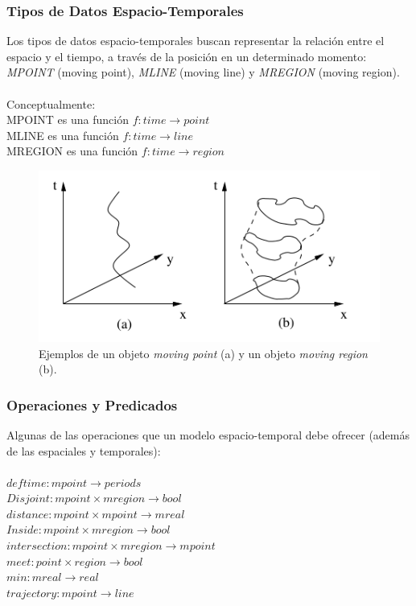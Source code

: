 \documentclass[a4paper,12pt,oneside]{report}
\begin{document}
\subsubsection*{Tipos de Datos Espacio-Temporales}
Los tipos de datos espacio-temporales buscan representar la relaci\'on entre el espacio y el tiempo, a trav\'es de la posici\'on en un determinado momento: \textit{MPOINT} (moving point), \textit{MLINE} (moving line) y \textit{MREGION} (moving region).\\
\ \\
Conceptualmente:\\
MPOINT es una funci\'on $f : time \rightarrow point$\\
MLINE es una funci\'on $f : time \rightarrow line$\\
MREGION es una funci\'on $f : time \rightarrow region$\\
\begin{figure}[h]
\centering
\includegraphics[scale=0.4]{images/figure22.png}
\caption{Ejemplos de un objeto \textit{moving point} (a) y un objeto \textit{moving region} (b).}
\end{figure}

\subsubsection*{Operaciones y Predicados}
Algunas de las operaciones que un modelo espacio-temporal debe ofrecer (adem\'as de las espaciales y temporales):\\
\ \\
$deftime: mpoint \rightarrow periods$\\
$Disjoint: mpoint \times mregion \rightarrow bool$\\
$distance: mpoint \times mpoint \rightarrow mreal$\\
$Inside: mpoint \times mregion \rightarrow bool$\\
$intersection: mpoint \times mregion \rightarrow mpoint$\\
$meet: point \times region \rightarrow bool$\\
$min: mreal \rightarrow real$\\
$trajectory: mpoint \rightarrow line$\\
\end{document}
